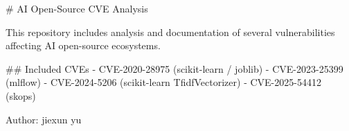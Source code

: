 # AI Open-Source CVE Analysis

This repository includes analysis and documentation of several vulnerabilities affecting AI open-source ecosystems.

## Included CVEs
- CVE-2020-28975 (scikit-learn / joblib)
- CVE-2023-25399 (mlflow)
- CVE-2024-5206 (scikit-learn TfidfVectorizer)
- CVE-2025-54412 (skops)

Author: jiexun yu